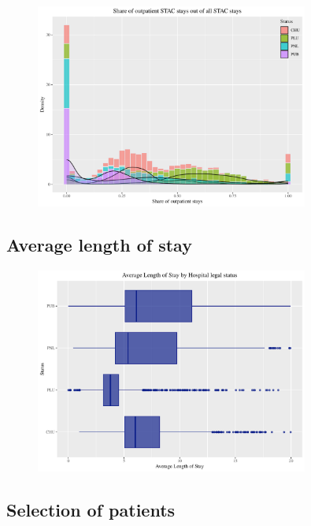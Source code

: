 \clearpage
\begin{figure}[!htb]
    \centering
    \includegraphics[width=0.8\textwidth]{../../Figures/2016-2019/STAC_share_all.pdf}
\end{figure}
\clearpage
\subsection{Average length of stay}


\begin{figure}[!htb]
    \centering
    \includegraphics[width=0.8\textwidth]{../../Figures/2016-2019/ALOS.pdf}
\end{figure}
\clearpage
\subsection{Selection of patients}


